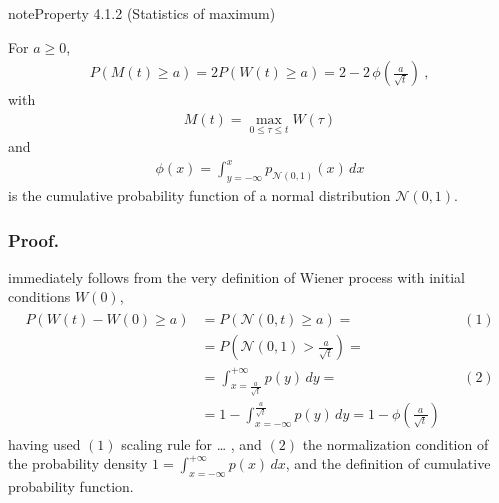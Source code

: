 \documentclass[letterpaper,10pt,english]{jupyterBook}
\begin{document}
\begin{sphinxadmonition}{note}{Property 4.1.2 (Statistics of maximum)}



\sphinxAtStartPar
For \(a \ge 0\),
\begin{equation*}
\begin{split}P\left( M(t) \ge a  \right) = 2 P \left( W(t) \ge a \right) = 2 - 2 \, \phi\left( \frac{a}{\sqrt{t}} \right) \ ,\end{split}
\end{equation*}
\sphinxAtStartPar
with
\begin{equation*}
\begin{split}M(t) = \max_{0 \le \tau \le t} W(\tau)\end{split}
\end{equation*}
\sphinxAtStartPar
and
\begin{equation*}
\begin{split}\phi(x) = \int_{y = -\infty}^{x} p_{\mathscr{N}(0,1)}(x) \, dx\end{split}
\end{equation*}
\sphinxAtStartPar
is the cumulative probability function of a normal distribution \(\mathscr{N}(0,1)\).
\end{sphinxadmonition}
\subsubsection*{Proof.}

\sphinxAtStartPar
{} immediately follows from the very definition of Wiener process with initial conditions \(W(0)\),
\begin{equation*}
\begin{split}\begin{aligned}
  P \left( W(t) - W(0) \ge a \right) 
  & = P \left( \mathscr{N}(0,t) \ge a \right) = && (1) \\
  & = P \left( \mathscr{N}\left(0, 1 \right) > \frac{a}{\sqrt{t}} \right) = \\
  & = \int_{x=\frac{a}{\sqrt{t}}}^{+\infty} p(y) \, dy = && (2) \\
  & = 1 - \int_{x=-\infty}^{\frac{a}{\sqrt{t}}} p(y) \, dy = 1 - \phi \left( \frac{a}{\sqrt{t}}  \right)
\end{aligned}\end{split}
\end{equation*}
\sphinxAtStartPar
having used \((1)\) scaling rule for {\hyperref[\detokenize{ch/prob/transformations:prob-transformations}]{}}… , and \((2)\) the normalization condition of the probability density \(1 = \int_{x = -\infty}^{+\infty} p(x) \, dx\), and the definition of cumulative probability function.
\end{document}
